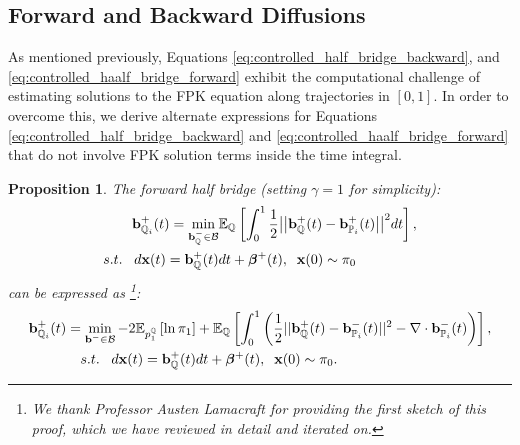 \documentclass[a4paper,12pt,twoside,openright]{report}
\newtheorem{proposition}{Proposition}
\theoremstyle{definition}
\begin{document}
\subsection{Forward and Backward Diffusions}

As mentioned previously, Equations \ref{eq:controlled_half_bridge_backward}, and \ref{eq:controlled_haalf_bridge_forward} exhibit the computational challenge of estimating solutions to the FPK equation along trajectories in $[0,1]$.  In order to overcome this, we derive alternate expressions for Equations \ref{eq:controlled_half_bridge_backward} and \ref{eq:controlled_haalf_bridge_forward} that do not involve FPK solution terms inside the time integral.
\begin{proposition}\label{prop:halfforcontrol}
The forward half bridge (setting $\gamma=1$  for simplicity):
\begin{align*} 
   {\mathbf{b}}^{+}_{{\mathbb{Q}}_{i}}(t) =\min_{{\mathbf{b}}_{\mathbb{Q}}^{-} \in {\mathcal{B}} } & \mathbb{E}_{\mathbb{Q}}\left[\int_0^1 \frac{1}{2}\big|\big|{\mathbf{b}}_{\mathbb{Q}}^{+}(t) -{\mathbf{b}}^{+}_{{\mathbb{P}}_{i}}(t)\big|\big|^2 dt\right], \nonumber \\
    s.t.\;\;\; d{\mathbf{x}}(t) = {\mathbf{b}}_{\mathbb{Q}}^{+}(t) &dt +  {\bm{\beta}}^{+}(t), \;\; {\mathbf{x}}(0) \sim \pi_0
\end{align*}
can be expressed as \footnote{We thank Professor Austen Lamacraft for providing the first sketch of this proof, which we have reviewed in detail and iterated on.}:
\begin{align} \label{eq:div_control_forward}
   {\mathbf{b}}^{+}_{{\mathbb{Q}}_{i}}(t) =\min_{{\mathbf{b}}^{-} \in {\mathcal{B}} } -2\mathbb{E}_{p^{{\mathbb{Q}}}_1}\left[\operatorname{ln} \pi_1 \right] &+ \mathbb{E}_{{\mathbb{Q}}}\left[\int_0^1 \left(\frac{1}{2}||{\mathbf{b}}_{\mathbb{Q}}^{+}(t) -{\mathbf{b}}_{{\mathbb{P}}_{i}}^{-}(t)||^2 - \nabla\cdot{\mathbf{b}}^{-}_{{\mathbb{P}}_{i}}(t) \right)\right], \nonumber \\
    s.t.\;\;\; d{\mathbf{x}}(t) = {\mathbf{b}}_{\mathbb{Q}}^{+}(t) &dt + {\bm{\beta}}^{+}(t), \;\; {\mathbf{x}}(0) \sim \pi_0.
\end{align}
\end{proposition}
\end{document}
